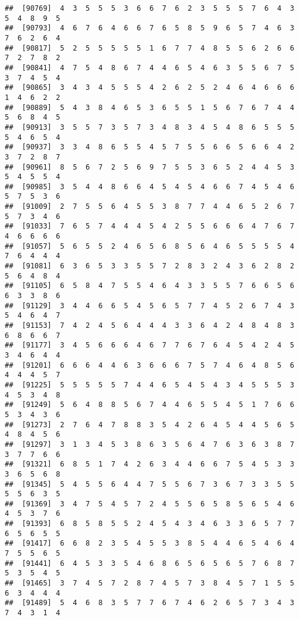 \documentclass[
]{book}
\begin{document}
\begin{verbatim}
##  [90769]  4  3  5  5  5  3  6  6  7  6  2  3  5  5  5  7  6  4  3  5  4  8  9  5
##  [90793]  4  6  7  6  4  6  6  7  6  5  8  5  9  6  5  7  4  6  3  7  6  2  6  4
##  [90817]  5  2  5  5  5  5  5  1  6  7  7  4  8  5  5  6  2  6  6  7  2  7  8  2
##  [90841]  4  7  5  4  8  6  7  4  4  6  5  4  6  3  5  5  6  7  5  3  7  4  5  4
##  [90865]  3  4  3  4  5  5  5  4  2  6  2  5  2  4  6  4  6  6  6  1  4  6  2  2
##  [90889]  5  4  3  8  4  6  5  3  6  5  5  1  5  6  7  6  7  4  4  5  6  8  4  5
##  [90913]  3  5  5  7  3  5  7  3  4  8  3  4  5  4  8  6  5  5  5  5  4  6  5  4
##  [90937]  3  3  4  8  6  5  5  4  5  7  5  5  6  6  5  6  6  4  2  3  7  2  8  7
##  [90961]  8  5  6  7  2  5  6  9  7  5  5  3  6  5  2  4  4  5  3  5  4  5  5  4
##  [90985]  3  5  4  4  8  6  6  4  5  4  5  4  6  6  7  4  5  4  6  5  7  5  3  6
##  [91009]  2  7  5  5  6  4  5  5  3  8  7  7  4  4  6  5  2  6  7  5  7  3  4  6
##  [91033]  7  6  5  7  4  4  4  5  4  2  5  5  6  6  6  4  7  6  7  4  6  6  6  6
##  [91057]  5  6  5  5  2  4  6  5  6  8  5  6  4  6  5  5  5  5  4  7  6  4  4  4
##  [91081]  6  3  6  5  3  3  5  5  7  2  8  3  2  4  3  6  2  8  2  5  6  4  8  4
##  [91105]  6  5  8  4  7  5  5  4  6  4  3  3  5  5  7  6  6  5  6  6  3  3  8  6
##  [91129]  3  4  4  6  6  5  4  5  6  5  7  7  4  5  2  6  7  4  3  5  4  6  4  7
##  [91153]  7  4  2  4  5  6  4  4  4  3  3  6  4  2  4  8  4  8  3  6  8  6  6  7
##  [91177]  3  4  5  6  6  6  4  6  7  7  6  7  6  4  5  4  2  4  5  3  4  6  4  4
##  [91201]  6  6  6  4  4  6  3  6  6  6  7  5  7  4  6  4  8  5  6  4  4  4  5  7
##  [91225]  5  5  5  5  5  7  4  4  6  5  4  5  4  3  4  5  5  5  3  4  5  3  4  8
##  [91249]  5  6  4  8  8  5  6  7  4  4  6  5  5  4  5  1  7  6  6  5  3  4  3  6
##  [91273]  2  7  6  4  7  8  8  3  5  4  2  6  4  5  4  4  5  6  5  4  8  4  5  6
##  [91297]  3  1  3  4  5  3  8  6  3  5  6  4  7  6  3  6  3  8  7  3  7  7  6  6
##  [91321]  6  8  5  1  7  4  2  6  3  4  4  6  6  7  5  4  5  3  3  3  6  5  6  8
##  [91345]  5  4  5  5  6  4  4  7  5  5  6  7  3  6  7  3  3  5  5  5  5  6  3  5
##  [91369]  3  4  7  5  4  5  7  2  4  5  5  6  5  8  5  6  5  4  6  4  5  3  7  6
##  [91393]  6  8  5  8  5  5  2  4  5  4  3  4  6  3  3  6  5  7  7  6  5  6  5  5
##  [91417]  6  6  8  2  3  5  4  5  5  3  8  5  4  4  6  5  4  6  4  7  5  5  6  5
##  [91441]  6  4  5  3  3  5  4  6  8  6  5  6  5  6  5  7  6  8  7  5  3  5  4  5
##  [91465]  3  7  4  5  7  2  8  7  4  5  7  3  8  4  5  7  1  5  5  6  3  4  4  4
##  [91489]  5  4  6  8  3  5  7  7  6  7  4  6  2  6  5  7  3  4  3  7  4  3  1  4

\end{verbatim}
\end{document}
